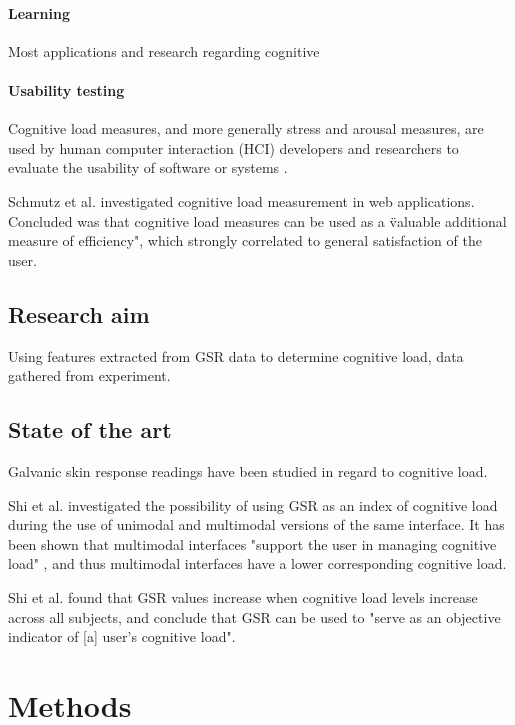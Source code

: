 \documentclass[12pt,fleqn,leqno,letterpaper]{article}
\begin{document}
\paragraph{Learning}
Most applications and research regarding cognitive 


\paragraph{Usability testing}
Cognitive load measures, and more generally stress and arousal measures, are used by human computer interaction (HCI) developers and researchers to evaluate the usability of software or systems \cite{Jacob2003} \cite{Schmutz2009}.

Schmutz et al. \cite{Schmutz2009} investigated cognitive load measurement in web applications. Concluded was that cognitive load measures can be used as a \"valuable additional measure of efficiency", which strongly correlated to general satisfaction of the user. 



\subsection{Research aim}
Using features extracted from GSR data to determine cognitive load, data gathered from experiment.

\subsection{State of the art}
Galvanic skin response readings have been studied in regard to cognitive load.

Shi et al. \cite{Shi2007} investigated the possibility of using GSR as an index of cognitive load during the use of unimodal and multimodal versions of the same interface. It has been shown that multimodal interfaces "support the user in managing cognitive load" \cite{Oviatt2004}, and thus multimodal interfaces have a lower corresponding cognitive load. 

Shi et al. found that GSR values increase when cognitive load levels increase across all subjects, and conclude that GSR can be used to "serve as an objective indicator of [a] user's cognitive load".





\section{Methods}
\end{document}
